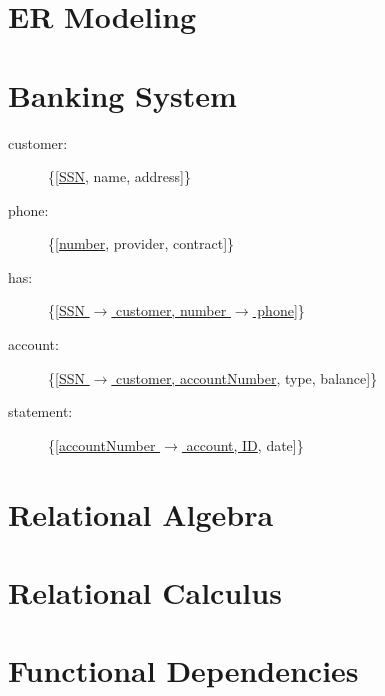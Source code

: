 \section{ER Modeling}

\section{Banking System}
\begin{description}
\item[customer:]{\{[\underline{SSN}, name, address]\}}
\item[phone:]{\{[\underline{number}, provider, contract]\}}
\item[has:]{\{[\underline{SSN $\rightarrow$ customer, number $\rightarrow$ phone}]\}}
\item[account:]{\{[\underline{SSN $\rightarrow$ customer, accountNumber}, type, balance]\}}
\item[statement:]{\{[\underline{accountNumber $\rightarrow$ account, ID}, date]\}}
\end{description}

\section{Relational Algebra}

\section{Relational Calculus}

\section{Functional Dependencies}

